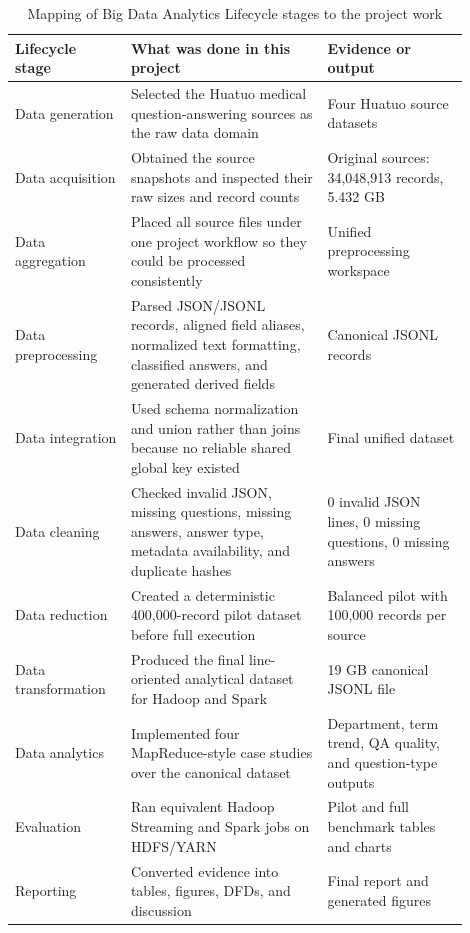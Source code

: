 \documentclass[12pt,a4paper]{article}
\begin{document}
\begin{table}[H]
\centering
\small
\caption{Mapping of Big Data Analytics Lifecycle stages to the project work}
\label{tab:lifecycle-mapping}
\begin{tabular}{p{0.22\linewidth}p{0.39\linewidth}p{0.29\linewidth}}
\toprule
Lifecycle stage & What was done in this project & Evidence or output \\
\midrule
Data generation & Selected the Huatuo medical question-answering sources as the raw data domain & Four Huatuo source datasets \\
Data acquisition & Obtained the source snapshots and inspected their raw sizes and record counts & Original sources: 34,048,913 records, 5.432 GB \\
Data aggregation & Placed all source files under one project workflow so they could be processed consistently & Unified preprocessing workspace \\
Data preprocessing & Parsed JSON/JSONL records, aligned field aliases, normalized text formatting, classified answers, and generated derived fields & Canonical JSONL records \\
Data integration & Used schema normalization and union rather than joins because no reliable shared global key existed & Final unified dataset \\
Data cleaning & Checked invalid JSON, missing questions, missing answers, answer type, metadata availability, and duplicate hashes & 0 invalid JSON lines, 0 missing questions, 0 missing answers \\
Data reduction & Created a deterministic 400,000-record pilot dataset before full execution & Balanced pilot with 100,000 records per source \\
Data transformation & Produced the final line-oriented analytical dataset for Hadoop and Spark & 19 GB canonical JSONL file \\
Data analytics & Implemented four MapReduce-style case studies over the canonical dataset & Department, term trend, QA quality, and question-type outputs \\
Evaluation & Ran equivalent Hadoop Streaming and Spark jobs on HDFS/YARN & Pilot and full benchmark tables and charts \\
Reporting & Converted evidence into tables, figures, DFDs, and discussion & Final report and generated figures \\
\bottomrule
\end{tabular}
\end{table}
\end{document}
